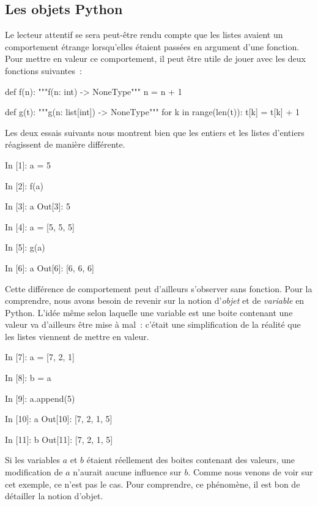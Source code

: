 \documentclass{magnolia}
\begin{document}
\subsection{Les objets Python}

Le lecteur attentif se sera peut-être rendu compte que les listes avaient un comportement étrange lorsqu'elles
étaient passées en argument d'une fonction. Pour mettre en valeur ce comportement, il peut être utile de
jouer avec les deux fonctions suivantes~:

\begin{pythoncodeline}
def f(n):
    """f(n: int) -> NoneType"""
    n = n + 1

def g(t):
    """g(n: list[int]) -> NoneType"""
    for k in range(len(t)):
        t[k] = t[k] + 1
\end{pythoncodeline}

\noindent Les deux essais suivants nous montrent bien que les entiers et les listes d'entiers réagissent
de manière différente.
\begin{pythoncode}
In [1]: a = 5

In [2]: f(a)

In [3]: a
Out[3]: 5
\end{pythoncode}

\begin{pythoncode}
In [4]: a = [5, 5, 5]

In [5]: g(a)

In [6]: a
Out[6]: [6, 6, 6]
\end{pythoncode}

\noindent 
Cette différence de comportement peut d'ailleurs s'observer sans fonction. Pour la comprendre,
nous avons besoin de revenir sur la notion d'\emph{objet} et de \emph{variable} en Python. L'idée même selon
laquelle une variable est une boite contenant une valeur va d'ailleurs être mise à mal~: c'était une
simplification de la réalité que les listes viennent de mettre en valeur.

\begin{pythoncode}
In [7]: a = [7, 2, 1]

In [8]: b = a

In [9]: a.append(5)

In [10]: a
Out[10]: [7, 2, 1, 5]

In [11]: b
Out[11]: [7, 2, 1, 5]
\end{pythoncode}
\noindent
Si les variables $a$ et $b$ étaient réellement des boites contenant des valeurs, une modification de $a$
n'aurait aucune influence sur $b$. Comme nous venons de voir sur cet exemple, ce n'est pas le cas. Pour
comprendre, ce phénomène, il est bon de détailler la notion d'objet.\\
\end{document}
